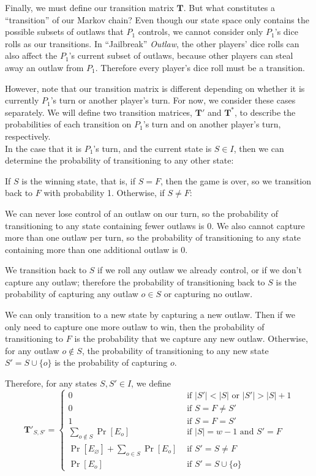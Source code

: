 \documentclass{article}
\newcommand{\T}{\textbf{{T}}}
\theoremstyle{definition}
\theoremstyle{plain}
\begin{document}
	Finally, we must define our transition matrix $\T$. But what constitutes a ``transition'' of our Markov chain? Even though our state space only contains the possible subsets of outlaws that $P_1$ controls, we cannot consider only $P_1$'s dice rolls as our transitions. In ``Jailbreak'' \textit{Outlaw}, the other players' dice rolls can also affect the $P_1$'s current subset of outlaws, because other players can steal away an outlaw from $P_1$. Therefore every player's dice roll must be a transition.

	However, note that our transition matrix is different depending on whether it is currently $P_1$'s turn or another player's turn. For now, we consider these cases separately. We will define two transition matrices, $\T'$ and $\T^*$, to describe the probabilities of each transition on $P_1$'s turn and on another player's turn, respectively.\\


	In the case that it is $P_1$'s turn, and the current state is $S \in I$, then we can determine the probability of transitioning to any other state:

	If $S$ is the winning state, that is, if $S = F$, then the game is over, so we transition back to $F$ with probability 1. Otherwise, if $S \neq F$:

	We can never lose control of an outlaw on our turn, so the probability of transitioning to any state containing fewer outlaws is 0. We also cannot capture more than one outlaw per turn, so the probability of transitioning to any state containing more than one additional outlaw is 0.

	We transition back to $S$ if we roll any outlaw we already control, or if we don't capture any outlaw; therefore the probability of transitioning back to $S$ is the probability of capturing any outlaw $o \in S$ or capturing no outlaw.

	We can only transition to a new state by capturing a new outlaw. Then if we only need to capture one more outlaw to win, then the probability of transitioning to $F$ is the probability that we capture any new outlaw. Otherwise, for any outlaw $o \not \in S$, the probability of transitioning to any new state $S' = S \cup \{o\}$ is the probability of capturing $o$.

	Therefore, for any states $S, S' \in I$, we define \[\T'_{S, S'} =
	\begin{cases}
	0 &\text{ if $|S'| < |S|$ or $|S'| > |S| + 1$}\\
	0 &\text{ if $S = F \neq S'$}\\
	1 &\text{ if $S = F = S'$}\\
	\sum\limits_{o \not \in S} \Pr[E_o] &\text{ if $|S| = w - 1$ and $S' = F$}\\
	\Pr[E_\varnothing] + \sum\limits_{o \in S} \Pr[E_o] &\text{ if $S' = S \neq F$}\\
	\Pr[E_o] &\text{ if $S' = S \cup \{o\}$}
	\end{cases}\]
\end{document}
